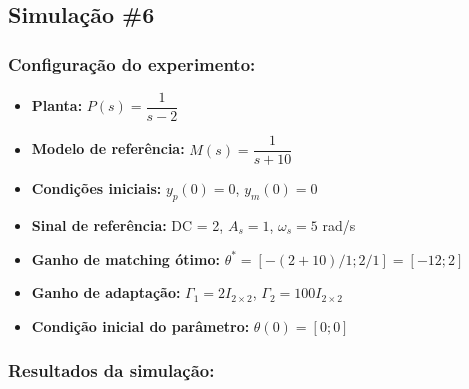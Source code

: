 \documentclass[10pt]{article}
\begin{document}
\newpage

\subsection{Simulação \#6}
\subsubsection{Configuração do experimento:}
\begin{itemize}
\item \textbf{Planta:} $P(s) = \dfrac{1}{s - 2}$
\item \textbf{Modelo de referência:} $M(s) = \dfrac{1}{s + 10}$
\item \textbf{Condições iniciais:} $y_p(0)=0$, $y_m(0)=0$
\item \textbf{Sinal de referência:} DC = 2, $A_s=1$, $\omega_s=5$ rad/s
\item \textbf{Ganho de matching ótimo:} $\theta^* = [-(2+10)/1;2/1] = [-12;2]$
\item \textbf{Ganho de adaptação:} $\Gamma_1 = 2I_{2\times2}$, $\Gamma_2 = 100I_{2\times2}$
\item \textbf{Condição inicial do parâmetro:} $\theta(0) = [0;0]$
\end{itemize}

\subsubsection{Resultados da simulação:}
\end{document}
